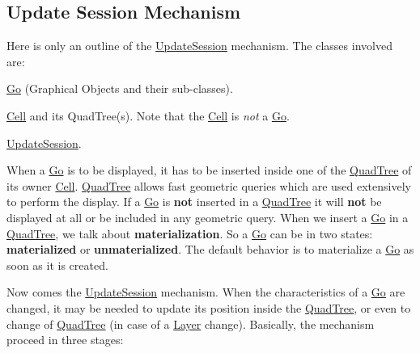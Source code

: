 \hypertarget{classHurricane_1_1UpdateSession_secUpdateSessionMechanism}{}\subsection{Update Session Mechanism}\label{classHurricane_1_1UpdateSession_secUpdateSessionMechanism}
Here is only an outline of the \mbox{\hyperlink{classHurricane_1_1UpdateSession}{Update\+Session}} mechanism. The classes involved are\+:
\begin{DoxyItemize}
\item \mbox{\hyperlink{classHurricane_1_1Go}{Go}} (Graphical Objects and their sub-\/classes).
\item \mbox{\hyperlink{classHurricane_1_1Cell}{Cell}} and it\textquotesingle{}s Quad\+Tree(s). Note that the \mbox{\hyperlink{classHurricane_1_1Cell}{Cell}} is {\itshape not} a \mbox{\hyperlink{classHurricane_1_1Go}{Go}}.
\item \mbox{\hyperlink{classHurricane_1_1UpdateSession}{Update\+Session}}.
\end{DoxyItemize}

When a \mbox{\hyperlink{classHurricane_1_1Go}{Go}} is to be displayed, it has to be inserted inside one of the \mbox{\hyperlink{classHurricane_1_1QuadTree}{Quad\+Tree}} of it\textquotesingle{}s owner \mbox{\hyperlink{classHurricane_1_1Cell}{Cell}}. \mbox{\hyperlink{classHurricane_1_1QuadTree}{Quad\+Tree}} allows fast geometric queries which are used extensively to perform the display. If a \mbox{\hyperlink{classHurricane_1_1Go}{Go}} is {\bfseries not} inserted in a \mbox{\hyperlink{classHurricane_1_1QuadTree}{Quad\+Tree}} it will {\bfseries not} be displayed at all or be included in any geometric query. When we insert a \mbox{\hyperlink{classHurricane_1_1Go}{Go}} in a \mbox{\hyperlink{classHurricane_1_1QuadTree}{Quad\+Tree}}, we talk about {\bfseries materialization}. So a \mbox{\hyperlink{classHurricane_1_1Go}{Go}} can be in two states\+: {\bfseries materialized} or {\bfseries unmaterialized}. The default behavior is to materialize a \mbox{\hyperlink{classHurricane_1_1Go}{Go}} as soon as it is created.

Now comes the \mbox{\hyperlink{classHurricane_1_1UpdateSession}{Update\+Session}} mechanism. When the characteristics of a \mbox{\hyperlink{classHurricane_1_1Go}{Go}} are changed, it may be needed to update it\textquotesingle{}s position inside the \mbox{\hyperlink{classHurricane_1_1QuadTree}{Quad\+Tree}}, or even to change of \mbox{\hyperlink{classHurricane_1_1QuadTree}{Quad\+Tree}} (in case of a \mbox{\hyperlink{classHurricane_1_1Layer}{Layer}} change). Basically, the mechanism proceed in three stages\+:



